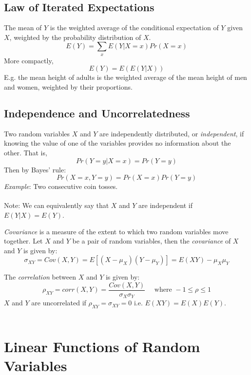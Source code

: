 \documentclass{./../../Latex/handout}
\begin{document}
\subsection{Law of Iterated Expectations}
The mean of $Y$ is the weighted average of the conditional expectation of $Y$ given $X$, weighted by the probability distribution of $X$.
$$ E(Y) = \sum_x E(Y|X=x) Pr(X=x) $$
More compactly,
$$ E(Y) = E(E(Y|X)) $$
E.g. the mean height of adults is the weighted average of the mean height
of men and women, weighted by their proportions.  

\subsection{Independence and Uncorrelatedness}

Two random variables $X$ and $Y$ are independently distributed, or \textit{independent}, if knowing the value of one of the variables provides no information about the other. That is,
$$ Pr(Y=y | X=x) = Pr(Y=y)  $$
Then by Bayes' rule:
$$ Pr(X=x, Y=y) = Pr(X=x) Pr(Y=y)  $$
\textit{Example}: Two consecutive coin tosses. \\~\\
Note: We can equivalently say that $X$ and $Y$ are independent if $E(Y|X) = E(Y)$.

\textit{Covariance} is a measure of the extent to which two random variables move
together. Let $X$ and $Y$ be a pair of random variables, then the \textit{covariance} of $X$ and $Y$ is given by:
$$ \sigma_{XY} = Cov(X,Y) = E[(X-\mu_X)(Y-\mu_Y)] = E(XY)-\mu_X \mu_Y $$ 

The \textit{correlation} between $X$ and $Y$ is given by:
$$ \rho_{XY} = corr(X,Y) = \frac{Cov(X,Y)}{\sigma_X \sigma_Y} \quad \text{ where } -1 \leq \rho \leq 1$$
$X$ and $Y$ are uncorrelated if $\rho_{XY}=\sigma_{XY}=0$ i.e. $E(XY)=E(X)E(Y)$. \\~\\


\section{Linear Functions of Random Variables}
\end{document}
